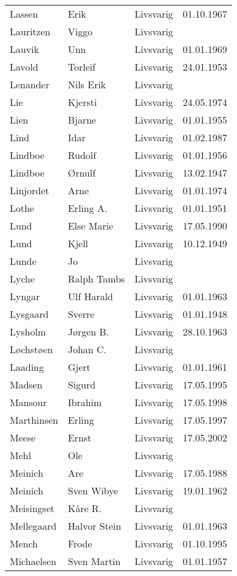 \begin{longtable}{llll}
Lassen	&	Erik	&	Livsvarig 	&	01.10.1967	\\
Lauritzen	&	Viggo	&	Livsvarig 	&		\\
Lauvik	&	Unn	&	Livsvarig 	&	01.01.1969	\\
Lavold	&	Torleif	&	Livsvarig 	&	24.01.1953	\\
Lenander	&	Nils Erik	&	Livsvarig 	&		\\
Lie	&	Kjersti	&	Livsvarig 	&	24.05.1974	\\
Lien	&	Bjarne	&	Livsvarig 	&	01.01.1955	\\
Lind	&	Idar	&	Livsvarig 	&	01.02.1987	\\
Lindboe	&	Rudolf	&	Livsvarig 	&	01.01.1956	\\
Lindboe	&	Ørnulf	&	Livsvarig 	&	13.02.1947	\\
Linjordet	&	Arne	&	Livsvarig 	&	01.01.1974	\\
Lothe	&	Erling A.	&	Livsvarig 	&	01.01.1951	\\
Lund	&	Else Marie	&	Livsvarig 	&	17.05.1990	\\
Lund	&	Kjell	&	Livsvarig 	&	10.12.1949	\\
Lunde	&	Jo	&	Livsvarig 	&		\\
Lyche	&	Ralph Tambs	&	Livsvarig 	&		\\
Lyngar	&	Ulf Harald	&	Livsvarig 	&	01.01.1963	\\
Lysgaard	&	Sverre	&	Livsvarig 	&	01.01.1948	\\
Lysholm	&	Jørgen B.	&	Livsvarig 	&	28.10.1963	\\
Løchstøen	&	Johan C.	&	Livsvarig 	&		\\
Laading	&	Gjert	&	Livsvarig 	&	01.01.1961	\\
Madsen 	&	Sigurd 	&	Livsvarig 	&	17.05.1995	\\
Mansour 	&	Ibrahim	&	Livsvarig	&	17.05.1998	\\
Marthinsen 	&	Erling	&	Livsvarig	&	17.05.1997	\\
Meese 	&	Ernst	&	Livsvarig	&	17.05.2002	\\
Mehl	&	Ole	&	Livsvarig 	&		\\
Meinich	&	Are	&	Livsvarig 	&	17.05.1988	\\
Meinich	&	Sven Wibye	&	Livsvarig 	&	19.01.1962	\\
Meisingset	&	Kåre R.	&	Livsvarig 	&		\\
Mellegaard	&	Halvor Stein	&	Livsvarig 	&	01.01.1963	\\
Mench 	&	Frode	&	Livsvarig	&	01.10.1995	\\
Michaelsen	&	Sven Martin	&	Livsvarig 	&	01.01.1957	\\

\end{longtable}
